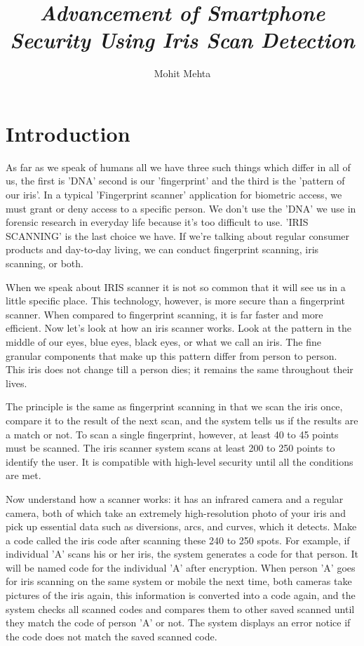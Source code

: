 \documentclass[9pt,twocolumn,twoside]{osajnl}
\title{ \emph{Advancement of Smartphone Security Using Iris Scan Detection  }}
\author{Mohit Mehta}
\affil{Publications Department, Christ University, 1969  S.G. Palya, Bengaluru, Karnataka 560029, India}
\affil{Department of Computer Science,Christ University, 2022  S.G. Palya, Bengaluru, Karnataka 560029, India}
\affil[*]{Corresponding author: mohit.mehta@mca.christuniversity.in}
\begin{document}
\maketitle

\section{Introduction}
As far as we speak of humans all we have three such things which differ in all of us, the first is 'DNA' second is our 'fingerprint' and the third is the 'pattern of our iris'. In a typical 'Fingerprint scanner' application for biometric access, we must grant or deny access to a specific person. We don't use the 'DNA' we use in forensic research in everyday life because it's too difficult to use. 'IRIS SCANNING' is the last choice we have. If we're talking about regular consumer products and day-to-day living, we can conduct fingerprint scanning, iris scanning, or both. 

When we speak about IRIS scanner it is not so common that it will see us in a little specific place. This technology, however, is more secure than a fingerprint scanner. When compared to
fingerprint scanning, it is far faster and more efficient. Now let's look at how an iris scanner works. Look at the pattern in the middle of our eyes, blue eyes, black eyes, or what we call an iris. The fine granular components that make up this pattern differ from person to person. This iris does not change till a person dies; it remains the same throughout their lives. 

The principle is the same as fingerprint scanning in that we scan the iris once, compare it to the result of the next scan, and the system tells us if the results are a match or not. To scan a single fingerprint, however, at least 40 to 45 points must be scanned. The iris scanner system scans at least 200 to 250 points to identify the user. It is compatible with high-level security until all the conditions are met.

Now understand how a scanner works: it has an infrared camera and a regular camera, both of which take an extremely high-resolution photo of your iris and pick up essential data such as diversions, arcs, and curves, which it detects. Make a code called the iris code after scanning these 240 to 250 spots. For example, if individual 'A' scans his or her iris, the system generates a code for that person. It will be named code for the individual 'A' after encryption. When person 'A' goes for iris scanning on the same system or mobile the next time, both cameras take pictures of the iris again, this information is converted into a code again, and the system checks all scanned codes and compares them to other saved scanned until they match the code of person 'A' or not. The system displays an error notice if the code does not match the saved scanned code.
\end{document}
